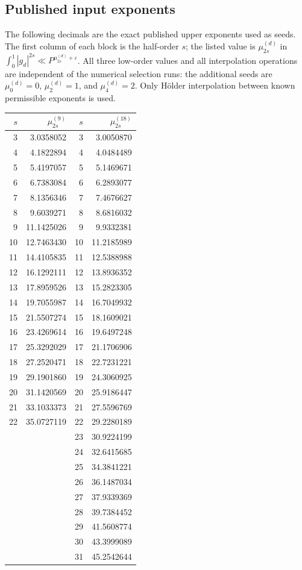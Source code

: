 \documentclass[11pt,letterpaper]{article}
\numberwithin{equation}{section}
\begin{document}
\subsection{Published input exponents}
The following decimals are the exact published upper exponents used as seeds.
The first column of each block is the half-order $s$; the listed value is
$\mu_{2s}^{(d)}$ in $\int_0^1|g_d|^{2s}\ll P^{\mu_{2s}^{(d)}+\varepsilon}$.
All three low-order values and all interpolation operations are independent
of the numerical selection runs: the additional seeds are
$\mu_0^{(d)}=0$, $\mu_2^{(d)}=1$, and $\mu_4^{(d)}=2$.
Only H\"older interpolation between known permissible exponents is used.
\begin{center}
\small
\begin{tabular}{rr@{\hspace{2.2cm}}rr}
\toprule
$s$ & $\mu_{2s}^{(9)}$ & $s$ & $\mu_{2s}^{(18)}$\\
\midrule
3 & 3.0358052 & 3 & 3.0050870\\
4 & 4.1822894 & 4 & 4.0484489\\
5 & 5.4197057 & 5 & 5.1469671\\
6 & 6.7383084 & 6 & 6.2893077\\
7 & 8.1356346 & 7 & 7.4676627\\
8 & 9.6039271 & 8 & 8.6816032\\
9 & 11.1425026 & 9 & 9.9332381\\
10 & 12.7463430 & 10 & 11.2185989\\
11 & 14.4105835 & 11 & 12.5388988\\
12 & 16.1292111 & 12 & 13.8936352\\
13 & 17.8959526 & 13 & 15.2823305\\
14 & 19.7055987 & 14 & 16.7049932\\
15 & 21.5507274 & 15 & 18.1609021\\
16 & 23.4269614 & 16 & 19.6497248\\
17 & 25.3292029 & 17 & 21.1706906\\
18 & 27.2520471 & 18 & 22.7231221\\
19 & 29.1901860 & 19 & 24.3060925\\
20 & 31.1420569 & 20 & 25.9186447\\
21 & 33.1033373 & 21 & 27.5596769\\
22 & 35.0727119 & 22 & 29.2280189\\
 &  & 23 & 30.9224199\\
 &  & 24 & 32.6415685\\
 &  & 25 & 34.3841221\\
 &  & 26 & 36.1487034\\
 &  & 27 & 37.9339369\\
 &  & 28 & 39.7384452\\
 &  & 29 & 41.5608774\\
 &  & 30 & 43.3999089\\
 &  & 31 & 45.2542644\\
\bottomrule
\end{tabular}
\end{center}
\end{document}

